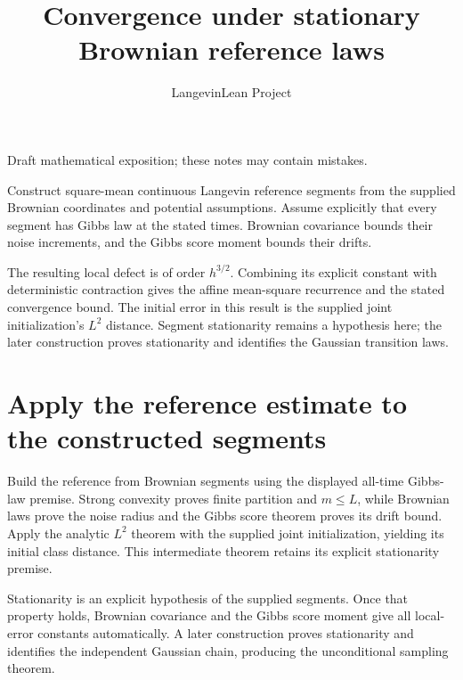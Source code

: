 \documentclass[11pt,a4paper]{article}
\title{\texorpdfstring{Convergence under stationary Brownian reference laws}{Convergence under stationary Brownian reference laws}}
\author{LangevinLean Project}
\date{}
\begin{document}
\maketitle
Draft mathematical exposition; these notes may contain mistakes.


Construct square-mean continuous Langevin reference segments from the supplied Brownian coordinates and potential assumptions. Assume explicitly that every segment has Gibbs law at the stated times. Brownian covariance bounds their noise increments, and the Gibbs score moment bounds their drifts.



The resulting local defect is of order \(h^{3/2}\). Combining its explicit constant with deterministic contraction gives the affine mean-square recurrence and the stated convergence bound. The initial error in this result is the supplied joint initialization's \(L^2\) distance. Segment stationarity remains a hypothesis here; the later construction proves stationarity and identifies the Gaussian transition laws.


\section{\texorpdfstring{Apply the reference estimate to the constructed segments}{Apply the reference estimate to the constructed segments}}


Build the reference from Brownian segments using the displayed all-time Gibbs-law premise. Strong convexity proves finite partition and \(m\le L\), while Brownian laws prove the noise radius and the Gibbs score theorem proves its drift bound. Apply the analytic \(L^2\) theorem with the supplied joint initialization, yielding its initial class distance. This intermediate theorem retains its explicit stationarity premise.



Stationarity is an explicit hypothesis of the supplied segments. Once that property holds, Brownian covariance and the Gibbs score moment give all local-error constants automatically. A later construction proves stationarity and identifies the independent Gaussian chain, producing the unconditional sampling theorem.
\end{document}
